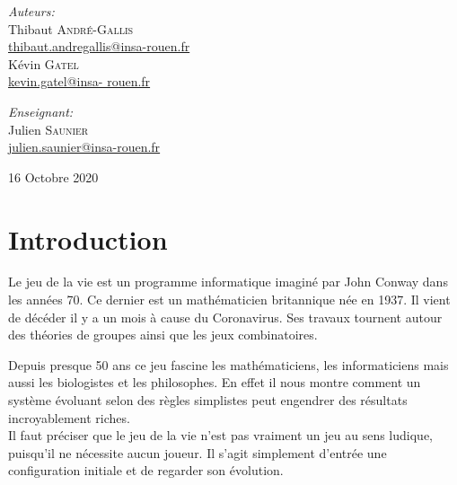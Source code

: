 \documentclass[12,french]{report}
\begin{document}
\begin{titlepage}
\begin{center}
	\begin{minipage}{0.4\textwidth}
		\begin{flushleft} \large
			\emph{Auteurs:}\\
			Thibaut \textsc{André-Gallis} \\
			{\small\href{mailto:thibaut.andregallis@insa-rouen.fr}{thibaut.andregallis@insa-rouen.fr}} \\
			Kévin \textsc{Gatel} \\
			{\small\href{mailto:kevin.gatel@insa-rouen.fr}{kevin.gatel@insa-				rouen.fr}}
		\end{flushleft}
	\end{minipage}
	\begin{minipage}{0.4\textwidth}
		\begin{flushright} \large
			\emph{Enseignant:} \\
			Julien \textsc{Saunier} \\
			{\small\href{mailto:julien.saunier@insa-rouen.fr}								{julien.saunier@insa-rouen.fr}}
		\end{flushright}
	\end{minipage}

	\vfill
	{\large 16 Octobre 2020}
\end{center}
\end{titlepage}

\tableofcontents

\listoffigures

\renewcommand{\chaptername}{}
\chapter*{Introduction}

Le jeu de la vie est un programme informatique imaginé par John Conway dans les années 70. Ce dernier est un mathématicien britannique née en 1937. Il vient de décéder il y a un mois à cause du Coronavirus. Ses travaux tournent autour des théories de groupes ainsi que les jeux combinatoires.

Depuis presque 50 ans ce jeu fascine les mathématiciens, les informaticiens mais aussi les biologistes et les philosophes. En effet il nous montre comment un système évoluant selon des règles simplistes peut engendrer des résultats incroyablement riches.\\

Il faut préciser que le jeu de la vie n'est pas vraiment un jeu au sens ludique, puisqu'il ne nécessite aucun joueur. Il s'agit simplement d'entrée une configuration initiale et de regarder son évolution. 
\end{document}
